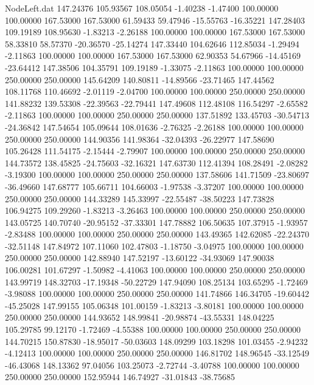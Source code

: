 \begin{filecontents}{NodeLeft.dat}
 147.24376  105.93567  108.05054    -1.40238   -1.47400  100.00000  100.00000  167.53000  167.53000   61.59433   59.47946  -15.55763  -16.35221
 147.28403  109.19189  108.95630    -1.83213   -2.26188  100.00000  100.00000  167.53000  167.53000   58.33810   58.57370  -20.36570  -25.14274
 147.33440  104.62646  112.85034    -1.29494   -2.11863  100.00000  100.00000  167.53000  167.53000   62.90353   54.67966  -14.45169  -23.64412
 147.38506  104.35791  109.19189    -1.33075   -2.11863  100.00000  100.00000  250.00000  250.00000  145.64209  140.80811  -14.89566  -23.71465
 147.44562  108.11768  110.46692    -2.01119   -2.04700  100.00000  100.00000  250.00000  250.00000  141.88232  139.53308  -22.39563  -22.79441
 147.49608  112.48108  116.54297    -2.65582   -2.11863  100.00000  100.00000  250.00000  250.00000  137.51892  133.45703  -30.54713  -24.36842
 147.54654  105.09644  108.01636    -2.76325   -2.26188  100.00000  100.00000  250.00000  250.00000  144.90356  141.98364  -32.04393  -26.22977
 147.58690  105.26428  111.54175    -2.15444   -2.79907  100.00000  100.00000  250.00000  250.00000  144.73572  138.45825  -24.75603  -32.16321
 147.63730  112.41394  108.28491    -2.08282   -3.19300  100.00000  100.00000  250.00000  250.00000  137.58606  141.71509  -23.80697  -36.49660
 147.68777  105.66711  104.66003    -1.97538   -3.37207  100.00000  100.00000  250.00000  250.00000  144.33289  145.33997  -22.55487  -38.50223
 147.73828  106.94275  109.29260    -1.83213   -3.26463  100.00000  100.00000  250.00000  250.00000  143.05725  140.70740  -20.95152  -37.33301
 147.78882  106.50635  107.37915    -1.93957   -2.83488  100.00000  100.00000  250.00000  250.00000  143.49365  142.62085  -22.24370  -32.51148
 147.84972  107.11060  102.47803    -1.18750   -3.04975  100.00000  100.00000  250.00000  250.00000  142.88940  147.52197  -13.60122  -34.93069
 147.90038  106.00281  101.67297    -1.50982   -4.41063  100.00000  100.00000  250.00000  250.00000  143.99719  148.32703  -17.19348  -50.22729
 147.94090  108.25134  103.65295    -1.72469   -3.98088  100.00000  100.00000  250.00000  250.00000  141.74866  146.34705  -19.60442  -45.25028
 147.99155  105.06348  101.00159    -1.83213   -3.80181  100.00000  100.00000  250.00000  250.00000  144.93652  148.99841  -20.98874  -43.55331
 148.04225  105.29785   99.12170    -1.72469   -4.55388  100.00000  100.00000  250.00000  250.00000  144.70215  150.87830  -18.95017  -50.03603
 148.09299  103.18298  101.03455    -2.94232   -4.12413  100.00000  100.00000  250.00000  250.00000  146.81702  148.96545  -33.12549  -46.43068
 148.13362   97.04056  103.25073    -2.72744   -3.40788  100.00000  100.00000  250.00000  250.00000  152.95944  146.74927  -31.01843  -38.75685

\end{filecontents}
